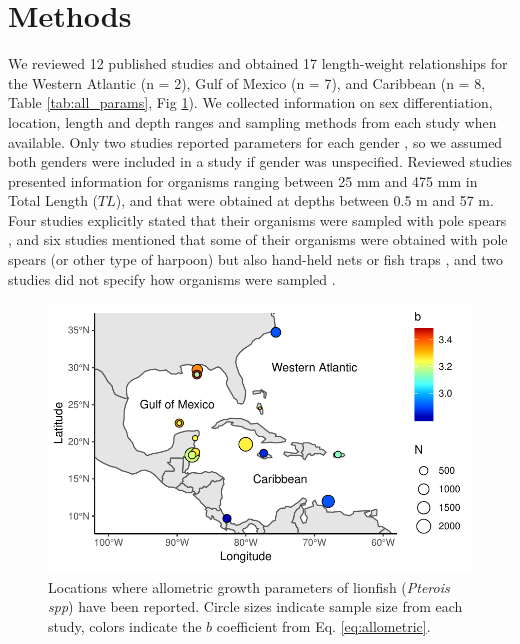 \documentclass[fleqn,10pt,lineno]{wlpeerj} %
\begin{document}
\clearpage

\section*{Methods}

We reviewed 12 published studies and obtained 17 length-weight
relationships for the Western Atlantic (n = 2), Gulf of Mexico (n = 7),
and Caribbean (n = 8, Table \ref{tab:all_params}, Fig \ref{fig:map}). We
collected information on sex differentiation, location, length and depth
ranges and sampling methods from each study when available. Only two
studies reported parameters for each gender
\citep{aguilarperera_2016,fogg_2013}, so we assumed both genders were
included in a study if gender was unspecified. Reviewed studies
presented information for organisms ranging between 25 mm and 475 mm in
Total Length (\(TL\)), and that were obtained at depths between 0.5 m
and 57 m. Four studies explicitly stated that their organisms were
sampled with pole spears
\citep{dahl_2014,aguilarperera_2016,chin_2016,sabidoitz_2016}, and six
studies mentioned that some of their organisms were obtained with pole
spears (or other type of harpoon) but also hand-held nets or fish traps
\citep{barbour_2011,fogg_2013,edwards_2014,toledohernndez_2014,sandel_2015,sabidoitza_2016},
and two studies did not specify how organisms were sampled
\citep{darling_2011,deleon_2013}.

\begin{figure}
\centering
\includegraphics{Manuscript_files/figure-latex/map-1.pdf}
\caption{\label{fig:map}Locations where allometric growth parameters of
lionfish (\emph{Pterois spp}) have been reported. Circle sizes indicate
sample size from each study, colors indicate the \(b\) coefficient from
Eq. \ref{eq:allometric}.}
\end{figure}
\end{document}
